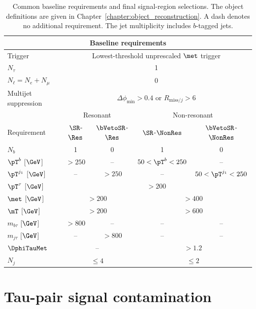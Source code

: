 \begin{table}[htbp]
    \centering
    \small
    \caption{Common baseline requirements and final signal-region selections. The object definitions are given in Chapter~\ref{chapter:object_reconstruction}. A dash denotes no additional requirement. The jet multiplicity includes $b$-tagged jets.}
    \label{tab:ch7_signal_regions}
    \begin{tabular}{lcccc}
        \toprule
        \multicolumn{5}{c}{Baseline requirements} \\
        \midrule
        Trigger & \multicolumn{4}{c}{Lowest-threshold unprescaled $\met$ trigger} \\
        $N_\tau$ & \multicolumn{4}{c}{1} \\
        $N_\ell=N_e+N_\mu$ & \multicolumn{4}{c}{0} \\
        Multijet suppression & \multicolumn{4}{c}{$\Delta\phi_{\min}>0.4$ or $R_{\mathrm{miss}/j}>6$} \\
        \midrule
        & \multicolumn{2}{c}{Resonant} & \multicolumn{2}{c}{Non-resonant} \\
        Requirement & $\SR$-$\Res$ & $\bVetoSR$-$\Res$ & $\SR$-$\NonRes$ & $\bVetoSR$-$\NonRes$ \\
        \midrule
        $N_b$ & 1 & 0 & 1 & 0 \\
        $\pT^b$ [$\GeV$] & $>250$ & -- & $50<\pT^b<250$ & -- \\
        $\pT^{j_1}$ [$\GeV$] & -- & $>250$ & -- & $50<\pT^{j_1}<250$ \\
        $\pT^\tau$ [$\GeV$] & \multicolumn{4}{c}{$>200$} \\
        $\met$ [$\GeV$] & \multicolumn{2}{c}{$>200$} & \multicolumn{2}{c}{$>400$} \\
        $\mT$ [$\GeV$] & \multicolumn{2}{c}{$>200$} & \multicolumn{2}{c}{$>600$} \\
        $m_{b\tau}$ [$\GeV$] & $>800$ & -- & -- & -- \\
        $m_{j\tau}$ [$\GeV$] & -- & $>800$ & -- & -- \\
        $\DphiTauMet$ & \multicolumn{2}{c}{--} & \multicolumn{2}{c}{$>1.2$} \\
        $N_j$ & \multicolumn{2}{c}{$\leq4$} & \multicolumn{2}{c}{$\leq2$} \\
        \bottomrule
    \end{tabular}
\end{table}

\clearpage
\section{Tau-pair signal contamination}
\label{sec:ch7_tautau_contamination}

